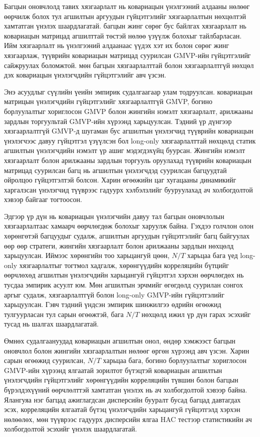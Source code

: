 Багцын оновчлолд тавих хязгаарлалт нь ковариацын үнэлгээний алдааны нөлөөг өөрчилж болох тул агшилтын аргуудын гүйцэтгэлийг хязгаарлалтын нөхцөлтэй хамтатган үнэлэх шаардлагатай. \citet{JagannathanMa2003} багцын жинг сөрөг бус байлгах хязгаарлалт нь ковариацын матрицад агшилттай төстэй нөлөө үзүүлж болохыг тайлбарласан. Ийм хязгаарлалт нь үнэлгээний алдаанаас үүдэх хэт их болон сөрөг жинг хязгаарлаж, түүврийн ковариацын матрицад суурилсан GMVP-ийн гүйцэтгэлийг сайжруулах боломжтой. \citet{ledoitwolf2017} мөн багцын хязгаарлалттай болон хязгаарлалтгүй нөхцөл дэх ковариацын үнэлэгчдийн гүйцэтгэлийг авч үзсэн.

Энэ асуудлыг сүүлийн үеийн эмпирик судалгаагаар улам тодруулсан. \citet{DomEtAl2025} ковариацын матрицын үнэлэгчдийн гүйцэтгэлийг хязгаарлалтгүй GMVP, богино борлуулалтыг хориглосон GMVP болон жингийн нэмэлт хязгаарлалт, арилжааны зардлын торгуультай GMVP-ийн хүрээнд харьцуулсан. Тэдний үр дүнгээр хязгаарлалтгүй GMVP-д шугаман бус агшилтын үнэлэгчид түүврийн ковариацын үнэлэгчээс давуу гүйцэтгэл үзүүлсэн бол long-only хязгаарлалттай нөхцөлд статик агшилтын үнэлэгчдийн нэмэлт үр ашиг мэдэгдэхүйц буурсан. Жингийн нэмэлт хязгаарлалт болон арилжааны зардлын торгууль оруулахад түүврийн ковариацын матрицад суурилсан багц нь агшилтын үнэлэгчдэд суурилсан багцуудтай ойролцоо гүйцэтгэлтэй болсон. Харин өгөөжийн цаг хугацааны динамикийг харгалзсан үнэлэгчид түүврээс гадуурх хэлбэлзлийг бууруулахад ач холбогдолтой хэвээр байгааг тогтоосон.

Эдгээр үр дүн нь ковариацын үнэлэгчийн давуу тал багцын оновчлолын хязгаарлалтаас хамаарч өөрчлөгдөж болохыг харуулж байна. Гэхдээ \citet{DomEtAl2025} голчлон олон хөрөнгөтэй багцуудыг судалж, агшилтын аргуудын гүйцэтгэлийг багц байгуулах өөр өөр стратеги, жингийн хязгаарлалт болон арилжааны зардлын нөхцөлд харьцуулсан. Иймээс хөрөнгийн тоо харьцангуй цөөн, $N/T$ харьцаа бага үед long-only хязгаарлалтыг тогтмол хадгалж, хөрөнгүүдийн корреляцийн бүтцийг өөрчлөхөд агшилтын үнэлэгчдийн харьцангуй гүйцэтгэл хэрхэн өөрчлөгдөх нь тусдаа эмпирик асуулт юм. Мөн \citet{DeNardKostovic2026} агшилтын эрчмийг өгөгдөлд суурилан сонгох аргыг судалж, хязгаарлалтгүй болон long-only GMVP-ийн гүйцэтгэлийг харьцуулсан. Гэвч тэдний үндсэн эмпирик шинжилгээ өдрийн өгөөжид тулгуурласан тул сарын өгөөжтэй, бага $N/T$ нөхцөлд ижил үр дүн гарах эсэхийг тусад нь шалгах шаардлагатай.

Өмнөх судалгаануудад ковариацын агшилтын онол, өндөр хэмжээст багцын оновчлол болон жингийн хязгаарлалтын нөлөөг өргөн хүрээнд авч үзсэн. Харин сарын өгөөжид суурилсан, \(N/T\) харьцаа бага, богино борлуулалтыг хориглосон GMVP-ийн хүрээнд ялгаатай зорилтот бүтэцтэй ковариацын агшилтын үнэлэгчдийн гүйцэтгэлийг хөрөнгүүдийн корреляцийн түвшин болон багцын бүрэлдэхүүний өөрчлөлттэй хамтатган үнэлэх нь ач холбогдолтой хэвээр байна. Ялангуяа нэг багцад ажиглагдсан дисперсийн бууралт бусад багцад давтагдах эсэх, корреляцийн ялгаатай бүтэц үнэлэгчдийн харьцангуй гүйцэтгэлд хэрхэн нөлөөлөх, мөн түүврээс гадуурх дисперсийн ялгаа HAC тестээр статистикийн ач холбогдолтой эсэхийг үнэлэх шаардлагатай.

